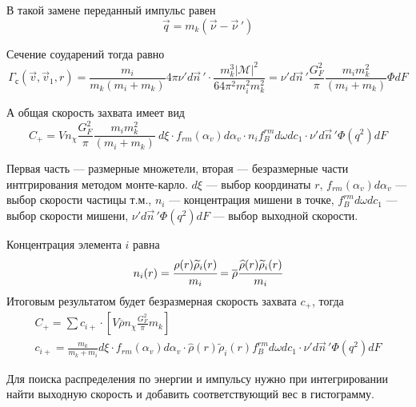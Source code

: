 В такой замене переданный импульс равен
\begin{equation*}
	\vec{q} = m_{k}\left( \vec{\nu} - {\vec{\nu}}\,' \right)
\end{equation*}

Сечение соударений тогда равно
\begin{equation*}
	\Gamma_{с}\left( {\vec{v},{\vec{v}}_{1},r} \right) = \frac{m_{i}}{m_{k}\left( m_{i} + m_{k} \right)}4\pi\nu'd\vec{n}\,' \cdot \frac{m_{k}^{3}\left| \mathcal{M} \right|^{2}}{64\pi^{2}m_{i}^{2}m_{k}^{2}} = \nu' d\vec{n}\,'\frac{G_{F}^{2}}{\pi}\frac{m_i m_{k}^{2}}{\left( m_{i} + m_{k} \right)}\Phi dF
\end{equation*}

А общая скорость захвата имеет вид
\begin{equation}
	\label{eq:capture_rate_result}
	C_+ = Vn_{\chi}\frac{G_{F}^{2}}{\pi}\frac{m_{i} m_{k}^{2}}{\left( {m_{i} + m_{k}} \right)}~d\xi \cdot f_{rm}\left( \alpha_{v} \right)d\alpha_{v} \cdot n_{i}f_{B}^{rm}d\omega dc_{1} \cdot \nu' d\vec{n}\,'\Phi\left( q^{2} \right)dF
\end{equation}

Первая часть --- размерные множетели, вторая --- безразмерные части интгрирования методом монте-карло. $d\xi$ --- выбор координаты $r$, $f_{rm}\left( \alpha_{v} \right)d\alpha_{v}$ --- выбор скорости частицы т.м., $n_{i}$ --- концентрация мишени в точке, $f_{B}^{rm}d\omega dc_{1}$ --- выбор скорости мишени, $\nu' d\vec{n}\,'\Phi\left( q^{2} \right)dF$ --- выбор выходной скорости.

Концентрация элемента $i$ равна
\begin{equation*}
	n_{i}(r) = \cfrac{\rho(r) \widetilde{\rho}_i(r)}{m_i} = 
	\overline{\rho}\cfrac{\widehat{\rho}(r) \widetilde{\rho}_i(r)}{m_i}
\end{equation*}
Итоговым результатом будет безразмерная скорость захвата $c_+$, тогда
\begin{align*}
	C_+ = \sum{c_{i+}} \cdot \left[ V\overline{\rho}n_{\chi}\frac{G_{F}^{2}}{\pi}m_k
	\right]
	\\
	c_{i+} = \frac{m_k}{m_k+m_i}d\xi \cdot f_{rm}\left( \alpha_{v} \right)d\alpha_{v} \cdot \widehat{\rho}(r) \widetilde{\rho}_i(r) f_{B}^{rm}d\omega dc_{1} \cdot \nu' d\vec{n}\,'\Phi\left( q^{2} \right)dF
\end{align*}

Для поиска распределения по энергии и импульсу нужно при интегрировании  найти выходную скорость и добавить соответствующий вес в гистограмму.





